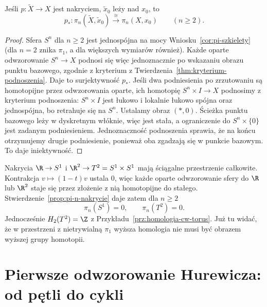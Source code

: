 \begin{stwierdzenie}
\label{prop:pi-n-nakrycie}
Jeśli $p:\widetilde X\to X$
jest nakryciem, $\widetilde x_0$
leży nad $x_0$, to
\[
 p_*:\pi_n(\widetilde X,\widetilde x_0)
 \xrightarrow{\ \cong\ }
 \pi_n(X,x_0)\qquad(n\geq2).
\]
\end{stwierdzenie}
\begin{proof}
Sfera $S^n$ dla $n\geq2$
jest jednospójna na mocy
Wniosku~\ref{cor:pi-szkielety}
(dla $n=2$ znika $\pi_1$,
a dla większych wymiarów
również). Każde oparte
odwzorowanie $S^n\to X$ podnosi
się więc jednoznacznie
po wskazaniu obrazu
punktu bazowego,
zgodnie z kryterium
z Twierdzenia~\ref{thm:kryterium-podnoszenia}.
Daje to surjektywność $p_*$.
Jeśli dwa podniesienia
po zrzutowaniu są
homotopijne przez odwzorowania oparte,
ich homotopię
$S^n\times I\to X$ podnosimy z kryterium podnoszenia:
$S^n\times I$ jest łukowo i lokalnie łukowo spójna oraz jednospójna,
bo retrahuje się na $S^n$. Ustalamy obraz $(\ast,0)$.
Ścieżka punktu bazowego leży w dyskretnym włóknie, więc jest stała,
a ograniczenie do $S^n\times\{0\}$ jest zadanym podniesieniem.
Jednoznaczność podnoszenia
sprawia, że na końcu
otrzymujemy drugie
podniesienie, ponieważ
oba zgadzają się w
punkcie bazowym.
To daje iniektywność.
\end{proof}

\begin{przyklad}
\label{prz:pi-torus}
Nakrycia $\R\to S^1$ i
$\R^2\to T^2=S^1\times S^1$
mają ściągalne przestrzenie
całkowite. Kontrakcja $v\mapsto(1-t)v$ ustala $0$,
więc każde oparte odwzorowanie sfery do $\R$ lub $\R^2$
staje się przez złożenie z nią homotopijne do stałego.
Stwierdzenie~\ref{prop:pi-n-nakrycie} daje zatem dla $n\geq2$
\[
 \pi_n(S^1)=0,\qquad
 \pi_n(T^2)=0.
\]
Jednocześnie
$H_2(T^2)=\Z$ z
Przykładu~\ref{prz:homologia-cw-torus}.
Już tu widać, że w
przestrzeni z nietrywialną
$\pi_1$ wyższa homologia
nie musi być obrazem
wyższej grupy homotopii.
\end{przyklad}


\section{Pierwsze odwzorowanie Hurewicza: od pętli do cykli}
\label{sec:hurewicz-jeden}


